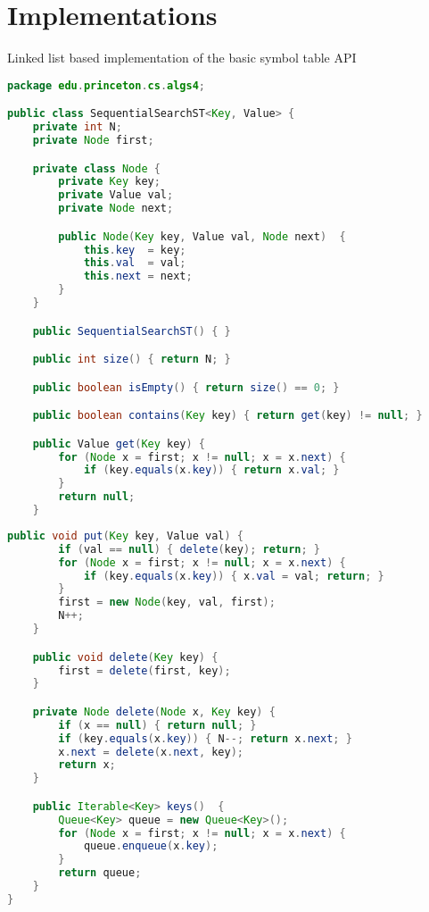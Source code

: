 \documentclass[8pt,a4paper,compress]{beamer}
\begin{document}
\section{Implementations}
\begin{frame}[fragile]
\pause

Linked list based implementation of the basic symbol table API

\begin{lstlisting}[language=Java]
package edu.princeton.cs.algs4;

public class SequentialSearchST<Key, Value> {
    private int N; 
    private Node first; 

    private class Node {
        private Key key;
        private Value val;
        private Node next;

        public Node(Key key, Value val, Node next)  {
            this.key  = key;
            this.val  = val;
            this.next = next;
        }
    }

    public SequentialSearchST() { }

    public int size() { return N; }

    public boolean isEmpty() { return size() == 0; }

    public boolean contains(Key key) { return get(key) != null; }

    public Value get(Key key) {
        for (Node x = first; x != null; x = x.next) {
            if (key.equals(x.key)) { return x.val; }
        }
        return null;
    }
\end{lstlisting}
\end{frame}

\begin{frame}[fragile]
\pause

\begin{lstlisting}[language=Java]
    public void put(Key key, Value val) {
        if (val == null) { delete(key); return; }
        for (Node x = first; x != null; x = x.next) {
            if (key.equals(x.key)) { x.val = val; return; }
        }
        first = new Node(key, val, first);
        N++;
    }

    public void delete(Key key) {
        first = delete(first, key);
    }

    private Node delete(Node x, Key key) {
        if (x == null) { return null; }
        if (key.equals(x.key)) { N--; return x.next; }
        x.next = delete(x.next, key);
        return x;
    }

    public Iterable<Key> keys()  {
        Queue<Key> queue = new Queue<Key>();
        for (Node x = first; x != null; x = x.next) {
            queue.enqueue(x.key);
        }
        return queue;
    }
}
\end{lstlisting}
\end{frame}
\end{document}
